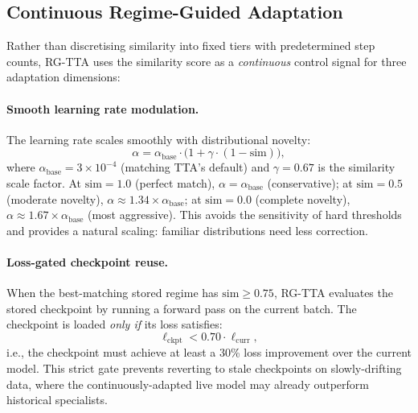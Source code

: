 \documentclass[11pt,a4paper]{article}
\begin{document}
\subsection{Continuous Regime-Guided Adaptation}
\label{sec:adaptation}

Rather than discretising similarity into fixed tiers with predetermined step counts, RG-TTA uses the similarity score as a \emph{continuous} control signal for three adaptation dimensions:

\paragraph{Smooth learning rate modulation.} The learning rate scales smoothly with distributional novelty:
\begin{equation}
  \alpha = \alpha_{\text{base}} \cdot \big(1 + \gamma \cdot (1 - \text{sim})\big),
  \label{eq:lr}
\end{equation}
where $\alpha_{\text{base}} = 3 \times 10^{-4}$ (matching TTA's default) and $\gamma = 0.67$ is the similarity scale factor. At $\text{sim} = 1.0$ (perfect match), $\alpha = \alpha_{\text{base}}$ (conservative); at $\text{sim} = 0.5$ (moderate novelty), $\alpha \approx 1.34 \times \alpha_{\text{base}}$; at $\text{sim} = 0.0$ (complete novelty), $\alpha \approx 1.67 \times \alpha_{\text{base}}$ (most aggressive). This avoids the sensitivity of hard thresholds and provides a natural scaling: familiar distributions need less correction.

\paragraph{Loss-gated checkpoint reuse.} When the best-matching stored regime has $\text{sim} \geq 0.75$, RG-TTA evaluates the stored checkpoint by running a forward pass on the current batch. The checkpoint is loaded \emph{only if} its loss satisfies:
\begin{equation}
  \ell_{\text{ckpt}} < 0.70 \cdot \ell_{\text{curr}},
  \label{eq:gate}
\end{equation}
i.e., the checkpoint must achieve at least a 30\% loss improvement over the current model. This strict gate prevents reverting to stale checkpoints on slowly-drifting data, where the continuously-adapted live model may already outperform historical specialists.
\end{document}
